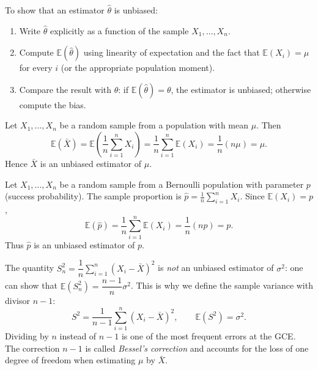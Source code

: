 \documentclass[11pt]{article}
\newcommand{\cle}[1]{{\popxbold\color{popdark}#1}}
\begin{document}
\begin{methode}
To show that an estimator $\hat{\theta}$ is unbiased:
\begin{enumerate}
\item Write $\hat{\theta}$ explicitly as a function of the sample $X_1, \dots, X_n$.
\item Compute $\mathbb{E}(\hat{\theta})$ using linearity of expectation and the fact that $\mathbb{E}(X_i) = \mu$ for every $i$ (or the appropriate population moment).
\item Compare the result with $\theta$: if $\mathbb{E}(\hat{\theta}) = \theta$, the estimator is unbiased; otherwise compute the bias.
\end{enumerate}
\end{methode}

\begin{exemplebox}
Let $X_1, \dots, X_n$ be a random sample from a population with mean $\mu$. Then
\[ \mathbb{E}(\bar{X}) = \mathbb{E}\!\left(\frac{1}{n}\sum_{i=1}^{n} X_i\right) = \frac{1}{n}\sum_{i=1}^{n}\mathbb{E}(X_i) = \frac{1}{n}(n\mu) = \mu. \]
Hence $\bar{X}$ is an unbiased estimator of $\mu$.
\end{exemplebox}

\begin{exemplebox}
Let $X_1, \dots, X_n$ be a random sample from a Bernoulli population with parameter $p$ (success probability). The sample proportion is $\hat{p} = \frac{1}{n}\sum_{i=1}^n X_i$. Since $\mathbb{E}(X_i)=p$,
\[ \mathbb{E}(\hat{p}) = \frac{1}{n}\sum_{i=1}^n \mathbb{E}(X_i) = \frac{1}{n}(np) = p. \]
Thus $\hat{p}$ is an unbiased estimator of $p$.
\end{exemplebox}

\begin{attention}
The quantity $S_n^2 = \dfrac{1}{n}\sum_{i=1}^n (X_i - \bar{X})^2$ is \emph{not} an unbiased estimator of $\sigma^2$: one can show that $\mathbb{E}(S_n^2) = \dfrac{n-1}{n}\sigma^2$. This is why we define the \cle{sample variance} with divisor $n-1$:
\[ S^2 = \frac{1}{n-1}\sum_{i=1}^n (X_i - \bar{X})^2, \qquad \mathbb{E}(S^2) = \sigma^2. \]
Dividing by $n$ instead of $n-1$ is one of the most frequent errors at the GCE. The correction $n-1$ is called \emph{Bessel's correction} and accounts for the loss of one degree of freedom when estimating $\mu$ by $\bar{X}$.
\end{attention}
\end{document}
